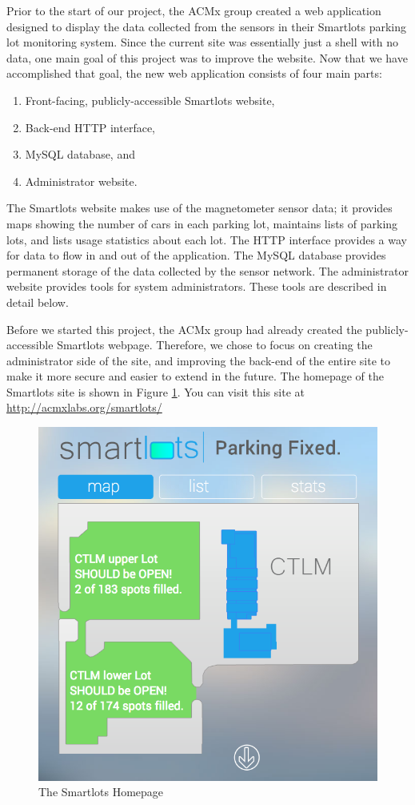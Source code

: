 \documentclass[11pt, oneside, fullpage, doublespace]{article}
\begin{document}
Prior to the start of our project, the ACMx group created a web application designed to display the data collected from the sensors in their Smartlots parking lot monitoring system. Since the current site was essentially just a shell with no data, one main goal of this project was to improve the website. Now that we have accomplished that goal, the new web application consists of four main parts:

\begin{enumerate}
\item Front-facing, publicly-accessible Smartlots website,
\item Back-end HTTP interface,
\item MySQL database, and
\item Administrator website.
\end{enumerate}

The Smartlots website makes use of the magnetometer sensor data; it provides maps showing the number of cars in each parking lot, maintains lists of parking lots, and lists usage statistics about each lot. The HTTP interface provides a way for data to flow in and out of the application. The MySQL database provides permanent storage of the data collected by the sensor network. The administrator website provides tools for system administrators. These tools are described in detail below.

Before we started this project, the ACMx group had already created the publicly-accessible Smartlots webpage. Therefore, we chose to focus on creating the administrator side of the site, and improving the back-end of the entire site to make it more secure and easier to extend in the future. The homepage of the Smartlots site is shown in Figure \ref{fig:homepage}. You can visit this site at \url{http://acmxlabs.org/smartlots/}

\begin{figure}
\begin{center}
\includegraphics[width=4.5in]{homepage}
\end{center}
\caption{The Smartlots Homepage}
\label{fig:homepage}
\end{figure}
\end{document}
